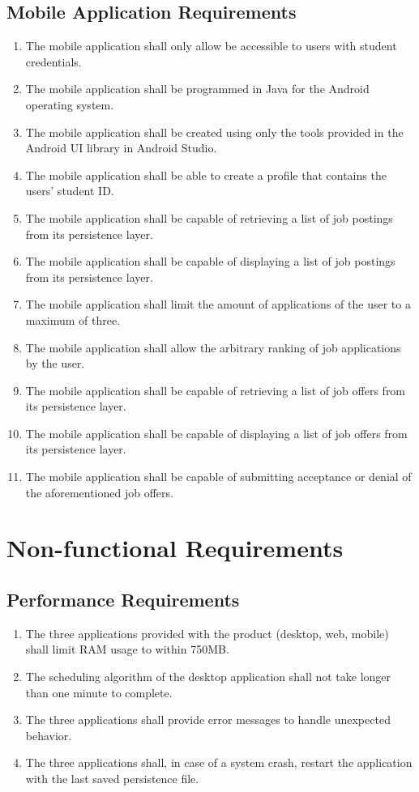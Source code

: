 \documentclass[12pt,openany]{report}
\begin{document}
\subsection{Mobile Application Requirements}
\begin{enumerate}[\thesubsection .1]
	\item The mobile application shall only allow be accessible to users with student credentials.
	\item The mobile application shall be programmed in Java for the Android operating system.
	\item The mobile application shall be created using only the tools provided in the Android UI library in Android Studio.
	\item The mobile application shall be able to create a profile that contains the users' student ID.
	\item The mobile application shall be capable of retrieving a list of job postings from its persistence layer.
	\item The mobile application shall be capable of displaying a list of job postings from its persistence layer.
	\item The mobile application shall limit the amount of applications of the user to a maximum of three.
	\item The mobile application shall allow the arbitrary ranking of job applications by the user.
	\item The mobile application shall be capable of retrieving a list of job offers from its persistence layer.
	\item The mobile application shall be capable of displaying a list of job offers from its persistence layer.
	\item The mobile application shall be capable of submitting acceptance or denial of the aforementioned job offers.
\end{enumerate}

\section{Non-functional Requirements}
\subsection{Performance Requirements}
\begin{enumerate}[\thesubsection .1]
	\item The three applications provided with the product (desktop, web, mobile) shall limit RAM usage to within 750MB.
	\item The scheduling algorithm of the desktop application shall not take longer than one minute to complete.
	\item The three applications shall provide error messages to handle unexpected behavior.
	\item The three applications shall, in case of a system crash, restart the application with the last saved persistence file.
\end{enumerate}
\end{document}
